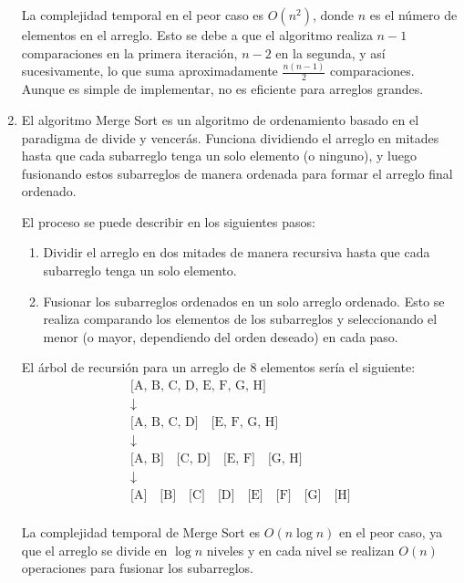 \documentclass[12pt]{article}
\begin{document}
\begin{enumerate}
            La complejidad temporal en el peor caso es \(O(n^2)\), donde \(n\) es el número de elementos en el arreglo. Esto se debe a que el algoritmo realiza \(n - 1\) comparaciones en la primera iteración, \(n - 2\) en la segunda, y así sucesivamente, lo que suma aproximadamente \(\frac{n(n-1)}{2}\) comparaciones. Aunque es simple de implementar, no es eficiente para arreglos grandes.
            
            \item El algoritmo Merge Sort es un algoritmo de ordenamiento basado en el paradigma de divide y vencerás. Funciona dividiendo el arreglo en mitades hasta que cada subarreglo tenga un solo elemento (o ninguno), y luego fusionando estos subarreglos de manera ordenada para formar el arreglo final ordenado.

            El proceso se puede describir en los siguientes pasos:
            \begin{enumerate}
                \item Dividir el arreglo en dos mitades de manera recursiva hasta que cada subarreglo tenga un solo elemento.
                \item Fusionar los subarreglos ordenados en un solo arreglo ordenado. Esto se realiza comparando los elementos de los subarreglos y seleccionando el menor (o mayor, dependiendo del orden deseado) en cada paso.
            \end{enumerate}

            El árbol de recursión para un arreglo de 8 elementos sería el siguiente:
            \[
            \begin{array}{c}
            \text{[A, B, C, D, E, F, G, H]} \\
            \downarrow \\
            \text{[A, B, C, D]} \quad \text{[E, F, G, H]} \\
            \downarrow \\
            \text{[A, B]} \quad \text{[C, D]} \quad \text{[E, F]} \quad \text{[G, H]} \\
            \downarrow \\
            \text{[A]} \quad \text{[B]} \quad \text{[C]} \quad \text{[D]} \quad \text{[E]} \quad \text{[F]} \quad \text{[G]} \quad \text{[H]} \\
            \end{array}
            \]

            La complejidad temporal de Merge Sort es \(O(n \log n)\) en el peor caso, ya que el arreglo se divide en \(\log n\) niveles y en cada nivel se realizan \(O(n)\) operaciones para fusionar los subarreglos.
            

\end{enumerate}
\end{document}
